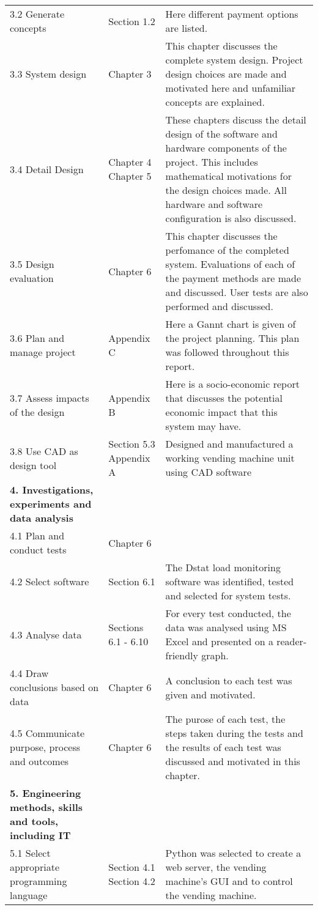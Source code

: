\begin{longtable}{|p{5.9cm}|p{2.2cm}|p{5.5cm}|}
3.2 Generate concepts & Section 1.2 & Here different payment options are listed.  \\

3.3 System design &  Chapter 3 & This chapter discusses the complete system design. Project design choices are made and motivated here and unfamiliar concepts are explained.   \\

3.4 Detail Design & Chapter 4
Chapter 5 & These chapters discuss the detail design of the software and hardware components of the project. This includes mathematical motivations for the  design choices made.  All hardware and software configuration is also discussed. \\

3.5 Design evaluation &  Chapter 6 & This chapter discusses the perfomance of the completed system. Evaluations of each of the payment methods are made and discussed. User tests are also performed and discussed. \\

3.6 Plan and manage project & Appendix C & Here a Gannt chart is given of the project planning. This plan was followed throughout this report. \\
\hline
3.7 Assess impacts of the design & Appendix B & Here is a socio-economic report that discusses the potential economic impact that this system may have.  \\

3.8 Use CAD as design tool & Section 5.3
Appendix A & Designed and manufactured a working vending machine unit using CAD software \\
\hline
{\bf 4. Investigations, experiments and data analysis} &            &            \\
4.1 Plan and conduct tests &  Chapter 6 &            \\

4.2 Select software & Section 6.1 & The Dstat load monitoring software was identified, tested and selected for system tests. \\

4.3 Analyse data & Sections 6.1 - 6.10 & For every test conducted, the data was analysed using MS Excel and presented on a reader-friendly graph.   \\

4.4 Draw conclusions based on data &  Chapter 6 & A conclusion to each test was given and motivated. \\

4.5 Communicate purpose, process and outcomes &  Chapter 6 & The purose of each test, the steps taken during the tests and the results of each test was discussed and motivated in this chapter.  \\
\hline
{\bf 5. Engineering methods, skills and tools, including IT} &            &            \\
5.1 Select appropriate programming language & Section 4.1
Section 4.2 & Python was selected to create a web server, the vending machine's GUI and to control the vending machine. \\


\end{longtable}
